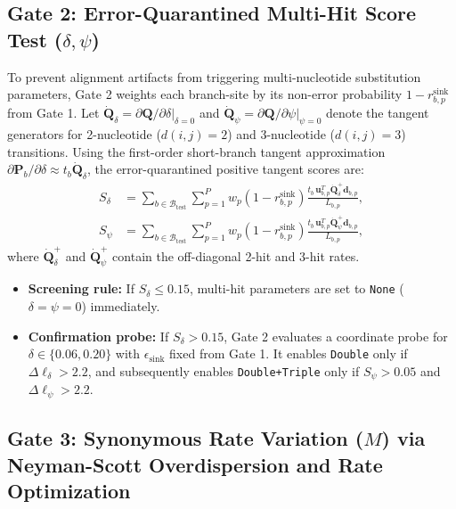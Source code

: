\documentclass[11pt]{article}
\begin{document}
\subsection{Gate 2: Error-Quarantined Multi-Hit Score Test ($\delta, \psi$)}

To prevent alignment artifacts from triggering multi-nucleotide substitution parameters, Gate 2 weights each branch-site by its non-error probability $1 - r_{b,p}^{\text{sink}}$ from Gate 1. Let $\dot{\bm{Q}}_\delta = \left.\partial \bm{Q} / \partial \delta\right|_{\delta=0}$ and $\dot{\bm{Q}}_\psi = \left.\partial \bm{Q} / \partial \psi\right|_{\psi=0}$ denote the tangent generators for 2-nucleotide ($d(i,j)=2$) and 3-nucleotide ($d(i,j)=3$) transitions. Using the first-order short-branch tangent approximation $\partial \bm{P}_b / \partial \delta \approx t_b \dot{\bm{Q}}_\delta$, the error-quarantined positive tangent scores are:
\begin{align}
    S_\delta &= \sum_{b \in \mathcal{B}_{\text{test}}} \sum_{p=1}^P w_p (1 - r_{b,p}^{\text{sink}}) \frac{t_b \, \bm{u}_{b,p}^T \dot{\bm{Q}}_\delta^+ \bm{d}_{b,p}}{L_{b,p}}, \\
    S_\psi   &= \sum_{b \in \mathcal{B}_{\text{test}}} \sum_{p=1}^P w_p (1 - r_{b,p}^{\text{sink}}) \frac{t_b \, \bm{u}_{b,p}^T \dot{\bm{Q}}_\psi^+ \bm{d}_{b,p}}{L_{b,p}},
\end{align}
where $\dot{\bm{Q}}_\delta^+$ and $\dot{\bm{Q}}_\psi^+$ contain the off-diagonal 2-hit and 3-hit rates.
\begin{itemize}[nosep]
    \item \textbf{Screening rule:} If $S_\delta \le 0.15$, multi-hit parameters are set to \texttt{None} ($\delta = \psi = 0$) immediately.
    \item \textbf{Confirmation probe:} If $S_\delta > 0.15$, Gate 2 evaluates a coordinate probe for $\delta \in \{0.06, 0.20\}$ with $\epsilon_{\text{sink}}$ fixed from Gate 1. It enables \texttt{Double} only if $\Delta \ell_\delta > 2.2$, and subsequently enables \texttt{Double+Triple} only if $S_\psi > 0.05$ and $\Delta \ell_\psi > 2.2$.
\end{itemize}

\subsection{Gate 3: Synonymous Rate Variation ($M$) via Neyman-Scott Overdispersion and Rate Optimization}
\end{document}
